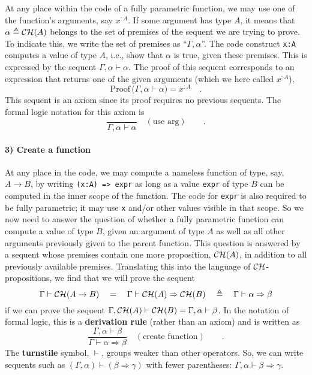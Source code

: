 At any place within the code of a fully parametric function, we may
use one of the function\textsf{'}s arguments, say $x^{:A}$. If some argument
has type $A$, it means that $\alpha\triangleq{\cal CH}(A)$ belongs
to the set of premises of the sequent we are trying to prove. To indicate
this, we write the set of premises as \textsf{``}$\Gamma,\alpha$\textsf{''}. The
code construct \lstinline!x:A! computes a value of type $A$, i.e.,
show that $\alpha$ is true, given these premises. This is expressed
by the sequent $\Gamma,\alpha\vdash\alpha$. The proof of this sequent
corresponds to an expression that returns one of the given arguments
(which we here called $x^{:A}$),
\[
\text{Proof}\,\big(\Gamma,\alpha\vdash\alpha\big)=x^{:A}\quad.
\]
This sequent is an axiom since its proof requires no previous sequents.
The formal logic notation for this axiom is
\[
\frac{~}{\Gamma,\alpha\vdash\alpha}\quad(\text{use arg})\quad\quad.
\]


\paragraph{3) Create a function}

At any place in the code, we may compute a nameless function of type,
say, $A\rightarrow B$, by writing \lstinline!(x:A) => expr! as long
as a value \lstinline!expr! of type $B$ can be computed in the inner
scope of the function. The code for \lstinline!expr! is also required
to be fully parametric; it may use \lstinline!x! and/or other values
visible in that scope. So we now need to answer the question of whether
a fully parametric function can compute a value of type $B$, given
an argument of type $A$ as well as all other arguments previously
given to the parent function. This question is answered by a sequent
whose premises contain one more proposition, ${\cal CH}(A)$, in addition
to all previously available premises. Translating this into the language
of ${\cal CH}$-propositions, we find that we will prove the sequent
\[
\Gamma\vdash{\cal CH}(A\rightarrow B)\quad=\quad\Gamma\vdash{\cal CH}(A)\Rightarrow{\cal CH}(B)\quad\triangleq\quad\Gamma\vdash\alpha\Rightarrow\beta
\]
if we can prove the sequent $\Gamma,{\cal CH}(A)\vdash{\cal CH}(B)=\Gamma,\alpha\vdash\beta$.
In the notation of formal logic, this is a \textbf{derivation rule}
(rather than an axiom) and is written as
\[
\frac{\Gamma,\alpha\vdash\beta}{\Gamma\vdash\alpha\Rightarrow\beta}\quad(\text{create function})\quad\quad.
\]
The \textbf{turnstile}
symbol, $\vdash$, groups weaker than other operators. So, we can
write sequents such as $(\Gamma,\alpha)\vdash(\beta\Rightarrow\gamma)$
with fewer parentheses: $\Gamma,\alpha\vdash\beta\Rightarrow\gamma$.

